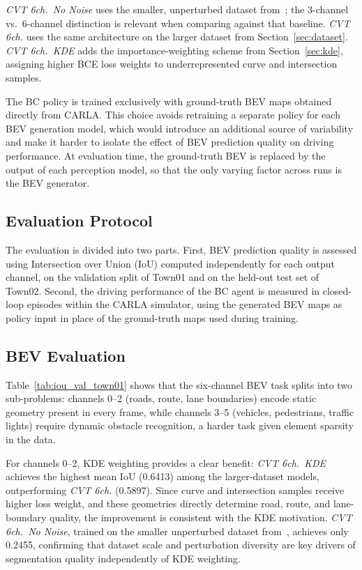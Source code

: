 \documentclass[12pt]{article}
\begin{document}
\textit{CVT 6ch.\ No Noise} uses the smaller, unperturbed dataset from~\cite{santos2025initial}; the 3-channel vs.\ 6-channel distinction is relevant when comparing against that baseline. \textit{CVT 6ch.} uses the same architecture on the larger dataset from Section~\ref{sec:dataset}. \textit{CVT 6ch.\ KDE} adds the importance-weighting scheme from Section~\ref{sec:kde}, assigning higher BCE loss weights to underrepresented curve and intersection samples.

The BC policy is trained exclusively with ground-truth BEV maps obtained directly
from CARLA. This choice avoids retraining a separate policy for each BEV generation
model, which would introduce an additional source of variability and make it harder
to isolate the effect of BEV prediction quality on driving performance. At evaluation
time, the ground-truth BEV is replaced by the output of each perception model, so
that the only varying factor across runs is the BEV generator.

\subsection{Evaluation Protocol}

The evaluation is divided into two parts. First, BEV prediction quality is assessed using Intersection over Union (IoU) computed independently for each output channel, on the validation split of Town01 and on the held-out test set of Town02. Second, the driving performance of the BC agent is measured in closed-loop episodes within the CARLA simulator, using the generated BEV maps as policy input in place of the ground-truth maps used during training.

\subsection{BEV Evaluation}

Table~\ref{tab:iou_val_town01} shows that the six-channel BEV task splits into two sub-problems: channels 0--2 (roads, route, lane boundaries) encode static geometry present in every frame, while channels 3--5 (vehicles, pedestrians, traffic lights) require dynamic obstacle recognition, a harder task given element sparsity in the data.

For channels 0--2, KDE weighting provides a clear benefit: \textit{CVT 6ch.\ KDE} achieves the highest mean IoU (0.6413) among the larger-dataset models, outperforming \textit{CVT 6ch.} (0.5897). Since curve and intersection samples receive higher loss weight, and these geometries directly determine road, route, and lane-boundary quality, the improvement is consistent with the KDE motivation. \textit{CVT 6ch.\ No Noise}, trained on the smaller unperturbed dataset from~\cite{santos2025initial}, achieves only 0.2455, confirming that dataset scale and perturbation diversity are key drivers of segmentation quality independently of KDE weighting.
\end{document}
